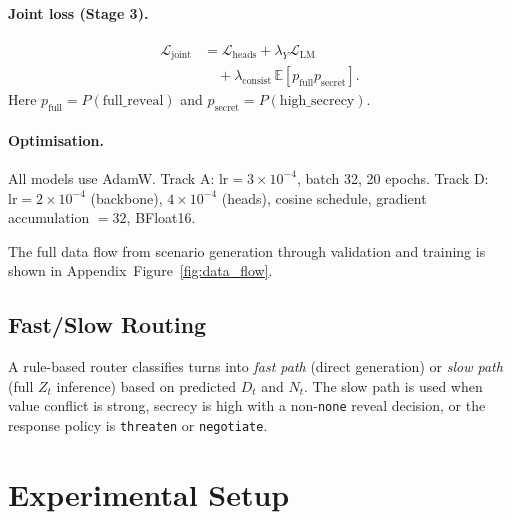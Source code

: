 \documentclass[11pt]{article}
\begin{document}
\paragraph{Joint loss (Stage 3).}
\label{sec:joint}
\begin{equation}
    \begin{aligned}
    \mathcal{L}_\text{joint}
    &= \mathcal{L}_\text{heads} + \lambda_Y \mathcal{L}_\text{LM} \\
    &\quad + \lambda_\text{consist}\,\mathbb{E}[p_\text{full}p_\text{secret}].
    \end{aligned}
\end{equation}
Here $p_\text{full}=P(\text{full\_reveal})$ and $p_\text{secret}=P(\text{high\_secrecy})$.

\paragraph{Optimisation.}
All models use AdamW.
Track A: $\text{lr}=3 \times 10^{-4}$, batch 32, 20 epochs.
Track D: $\text{lr}=2 \times 10^{-4}$ (backbone), $4 \times 10^{-4}$ (heads), cosine schedule, gradient accumulation $=32$, BFloat16.

The full data flow from scenario generation through validation and training is shown in Appendix~Figure~\ref{fig:data_flow}.

\subsection{Fast/Slow Routing}
\label{sec:routing}

A rule-based router classifies turns into \textit{fast path} (direct generation) or \textit{slow path} (full $Z_t$ inference) based on predicted $D_t$ and $N_t$.
The slow path is used when value conflict is strong, secrecy is high with a non-\texttt{none} reveal decision, or the response policy is \texttt{threaten} or \texttt{negotiate}.

\section{Experimental Setup}
\label{sec:experiments}
\end{document}
